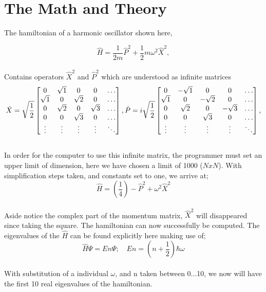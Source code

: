 \documentclass[12pt,letterpaper,notitlepage]{article}
\begin{document}
\section{The Math and Theory}

 The hamiltonian of a harmonic oscillator shown here, 

	\begin{equation}
		\hat{H} = \frac{1}{2m}\hat{P}^2 + \frac{1}{2}m\omega^2\hat{X}^2,       
	\end{equation}
\\
Contains operators $\hat{X}^2$ and $\hat{P}^2$ which are understood as infinite matrices 
\\
	\begin{equation}
		\hat{X} = \sqrt{\frac{1}{2}}
					\begin{bmatrix}
					0 		& \sqrt{1} 	& 0 		& 0 		& \dots \\
					\sqrt{1} 	& 0 		& \sqrt{2} 	& 0 		& \dots \\
					0 		& \sqrt{2} 	& 0 		& \sqrt{3} 	& \dots \\
					0 		& 0 		& \sqrt{3} 	& 0 		& \dots \\
					\vdots	& \vdots	& \vdots	& \vdots	& \ddots\\
					\end{bmatrix},
		\\\hat{P} = i\sqrt{\frac{1}{2}}
					\begin{bmatrix}
					0 		& -\sqrt{1} & 0 		& 0 		& \dots \\
					\sqrt{1} 	& 0 		& -\sqrt{2}	& 0 		& \dots \\
					0 		& \sqrt{2} 	& 0 		& -\sqrt{3} & \dots \\
					0 		& 0 		& \sqrt{3} 	& 0 		& \dots \\
					\vdots	& \vdots	& \vdots	& \vdots	& \ddots\\
					\end{bmatrix},			
	\end{equation}	
\\
In order for the computer to use this infinite matrix, the programmer must set an upper limit of dimension, here we have chosen a limit of 1000 ($NxN$). With simplification steps taken, and constants set to one, we arrive at;
\\
	\begin{equation}
		\hat{H} = (\frac{1}{4})-\hat{P}^2 + \omega^2\hat{X}^2
	\end{equation}
\\
Aside notice the complex part of the momentum matrix, $\hat{X}^2$ will disappeared since taking the square. The hamiltonian can now successfully be computed.
The eigenvalues of the $\hat{H}$ can be found explicitly here making use of; 
\\
	\begin{equation}
		\hat{H}\Psi = {En}\Psi ; \quad    {En} = (n + \frac{1}{2})\hbar\omega
	\end{equation}
\\
With substitution of a individual $\omega$, and n taken between 0...10, we now will have the first 10 real eigenvalues of the hamiltonian.  
\\
\end{document}
